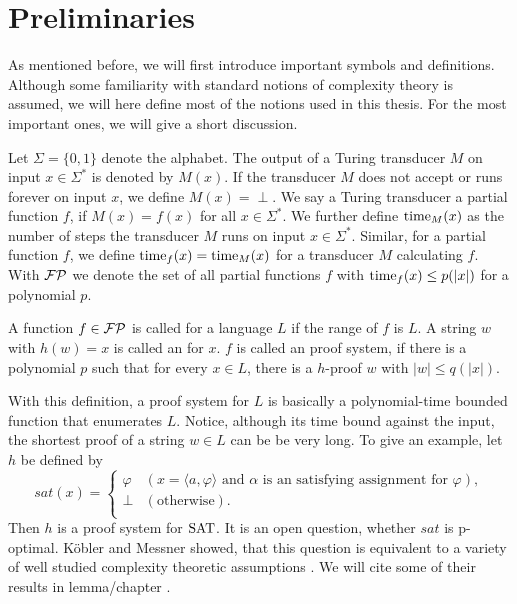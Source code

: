 \chapter{Preliminaries}
  As mentioned before, we will first introduce important symbols and definitions. Although some familiarity with standard notions of complexity theory is assumed, we will here define most of the notions used in this thesis. For the most important ones, we will give a short discussion.

  Let \(\Sigma = \{ 0, 1 \}\) denote the alphabet. The output of a Turing transducer \(M\) on input \(x \in \Sigma^*\) is denoted by \(M(x)\). If the transducer \(M\) does not accept or runs forever on input \(x\), we define \(M(x) = \perp\). We say a Turing transducer  a partial function \(f\), if \(M(x) = f(x)\) for all \(x \in \Sigma^*\). We further define \(\operatorname{time}_M(x)\) as the number of steps the transducer \(M\) runs on input \(x \in \Sigma^*\). Similar, for a partial function \(f\), we define \(\operatorname{time}_f(x) = \operatorname{time}_M(x)\) for a transducer \(M\) calculating \(f\).  With \(\mathcal{FP}\) we denote the set of all partial functions \(f\) with \(\operatorname{time}_f(x) \leq p(|x|)\) for a polynomial \(p\).

  \begin{definition}
    A function \(f \in \mathcal{FP}\) is called  for a language \(L\) if the range of \(f\) is \(L\). A string \(w\) with \(h(w) = x\) is called an  for \(x\). \(f\) is called an  proof system, if there is a polynomial \(p\) such that for every \(x \in L\), there is a \(h\)-proof \(w\) with \(|w| \leq q(|x|)\).
  \end{definition}

  With this definition, a proof system for \(L\) is basically a polynomial-time bounded function that enumerates \(L\). Notice, although its time bound against the input, the shortest proof of a string \(w \in L\) can be be very long. To give an example, let \(h\) be defined by
    \[
       sat(x) =
       \begin{cases}
         \varphi & (x = \langle a, \varphi \rangle \text{ and \(\alpha\) is an satisfying assignment for \(\varphi\)}), \\
         \perp & (\text{otherwise}). \\
       \end{cases}
    \]
  Then \(h\) is a proof system for \(\text{SAT}\). It is an open question, whether \(sat\) is p-optimal. Köbler and Messner showed, that this question is equivalent to a variety of well studied complexity theoretic assumptions \cite{KM00}. We will cite some of their results in lemma/chapter .

